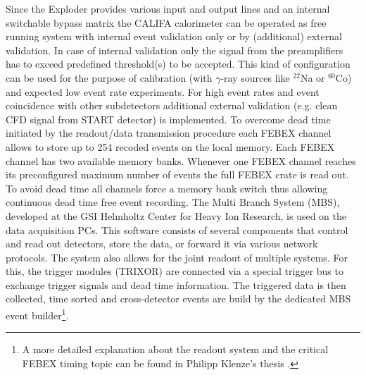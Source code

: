 Since the Exploder provides various input and output lines and an internal switchable bypass matrix the CALIFA calorimeter can be operated as free running system with internal event validation only or by (additional) external validation. In case of internal validation only the signal from the preamplifiers has to exceed predefined threshold(s) to be accepted. This kind of configuration can be used for  the purpose of calibration (with $\gamma$-ray sources like $^{22}$Na or $^{60}$Co) and expected low event rate experiments. For high event rates and event coincidence with other subdetectors additional external validation (e.g. clean CFD signal from START detector) is implemented.\newline
To overcome dead time initiated by the readout/data transmission procedure each FEBEX channel allows to store up to 254 recoded events on the local memory. Each FEBEX channel has two available memory banks. Whenever one FEBEX channel reaches its preconfigured maximum number of events the full FEBEX crate is read out. To avoid dead time all channels force a  memory bank switch thus allowing  continuous  dead time free event recording.\newline
The Multi Branch System (MBS), developed at the GSI Helmholtz Center for Heavy Ion Research, is used on the data acquisition PCs. This software consists of several components that control and read out detectors, store the data, or forward it via various network protocols. The system also allows for the joint readout of multiple systems. For this, the trigger modules (TRIXOR) are connected via a special trigger bus to exchange trigger signals and dead time information. The triggered data is then collected, time sorted and cross-detector events are build by the dedicated MBS event builder\footnote{A more detailed explanation about the readout system and the critical FEBEX timing topic can be found in Philipp Klenze's thesis \cite{pklenze}.}. 
